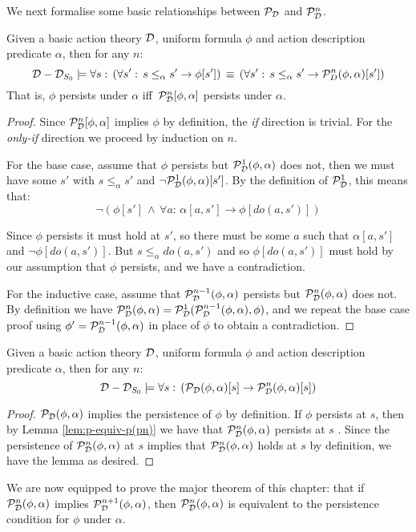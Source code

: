 We next formalise some basic relationships between $\mathcal{P}_{\mathcal{D}}$ and
$\mathcal{P}_{\mathcal{D}}^{n}$.

\begin{lemma}
Given a basic action theory $\mathcal{D}$, uniform formula $\phi$ and action
description predicate $\alpha$, then for any $n$:\label{lem:p-equiv-p(pn)}\[
\mathcal{D}-\mathcal{D}_{S_{0}}\models\forall s:\,\left(\forall s':\, s\leq_{\alpha}s'\rightarrow\phi[s']\right)\,\equiv\,\left(\forall s':\, s\leq_{\alpha}s'\rightarrow\mathcal{P}_{D}^{n}(\phi,\alpha)[s']\right)\]
 That is, $\phi$ persists under $\alpha$ iff $\,\mathcal{P}_{\mathcal{D}}^{n}[\phi,\alpha]$
persists under $\alpha$. 
\end{lemma}
\begin{proof}
Since $\mathcal{P}_{\mathcal{D}}^{n}[\phi,\alpha]$ implies $\phi$ by definition,
the \emph{if} direction is trivial. For the \emph{only-if} direction
we proceed by induction on $n$.

For the base case, assume that $\phi$ persists but $\mathcal{P}_{\mathcal{D}}^{1}(\phi,\alpha)$
does not, then we must have some $s'$ with $s\leq_{\alpha}s'$ and
$\neg\mathcal{P}_{\mathcal{D}}^{1}(\phi,\alpha)[s']$. By the definition of $\mathcal{P}_{\mathcal{D}}^{1}$,
this means that:\[
\neg\left(\phi[s']\,\wedge\,\forall a:\,\alpha[a,s']\rightarrow\phi[do(a,s')]\right)\]


Since $\phi$ persists it must hold at $s'$, so there must be some
$a$ such that $\alpha[a,s']$ and $\neg\phi[do(a,s')]$. But $s\leq_{\alpha}do(a,s')$
and so $\phi[do(a,s')]$ must hold by our assumption that $\phi$
persists, and we have a contradiction.

For the inductive case, assume that $\mathcal{P}_{\mathcal{D}}^{n-1}(\phi,\alpha)$
persists but $\mathcal{P}_{\mathcal{D}}^{n}(\phi,\alpha)$ does not. By definition
we have $\mathcal{P}_{\mathcal{D}}^{n}(\phi,\alpha)=\mathcal{P}_{\mathcal{D}}^{1}(\mathcal{P}_{\mathcal{D}}^{n-1}(\phi,\alpha),\phi)$,
and we repeat the base case proof using $\phi'=\mathcal{P}_{\mathcal{D}}^{n-1}(\phi,\alpha)$
in place of $\phi$ to obtain a contradiction. 
\end{proof}
\begin{lemma}
Given a basic action theory $\mathcal{D}$, uniform formula $\phi$ and action
description predicate $\alpha$, then for any $n$:\label{lem:p-implies-pn}\[
\mathcal{D}-\mathcal{D}_{S_{0}}\models\forall s:\,\left(\mathcal{P}_{\mathcal{D}}(\phi,\alpha)[s]\rightarrow\mathcal{P}_{\mathcal{D}}^{n}(\phi,\alpha)[s]\right)\]

\end{lemma}
\begin{proof}
$\mathcal{P}_{\mathcal{D}}(\phi,\alpha)$ implies the persistence of $\phi$ by definition.
If $\phi$ persists at $s$, then by Lemma \ref{lem:p-equiv-p(pn)}
we have that $\mathcal{P}_{\mathcal{D}}^{n}(\phi,\alpha)$ persists at $s$ . Since
the persistence of $\mathcal{P}_{\mathcal{D}}^{n}(\phi,\alpha)$ at $s$ implies
that $\mathcal{P}_{\mathcal{D}}^{n}(\phi,\alpha)$ holds at $s$ by definition, we
have the lemma as desired. 
\end{proof}
We are now equipped to prove the major theorem of this chapter: that
if $\mathcal{P}_{\mathcal{D}}^{n}(\phi,\alpha)$ implies $\mathcal{P}_{\mathcal{D}}^{n+1}(\phi,\alpha)$,
then $\mathcal{P}_{\mathcal{D}}^{n}(\phi,\alpha)$ is equivalent to the persistence
condition for $\phi$ under $\alpha$.

